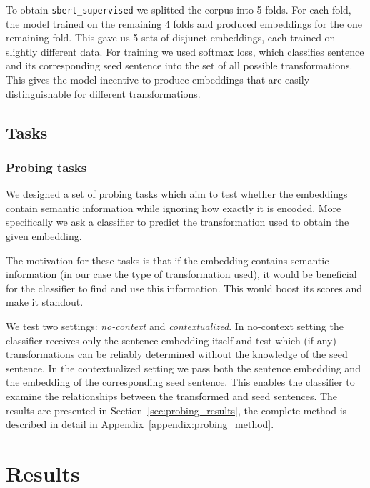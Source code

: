 \documentclass[11pt]{article}
\newcommand{\Embed}[1]{\texttt{#1}}
\begin{document}
To obtain \Embed{sbert\_supervised} we splitted the corpus into 5 folds. For
each fold, the model trained on the remaining 4 folds and produced embeddings
for the one remaining fold. This gave us 5 sets of disjunct embeddings, each
trained on slightly different data. For training we used softmax loss, which
classifies sentence and its corresponding seed sentence into the set of all
possible transformations. This gives the model incentive to produce embeddings
that are easily distinguishable for different transformations.


\subsection{Tasks}


\subsubsection{Probing tasks}

We designed a set of probing tasks which aim to test whether the embeddings
contain semantic information while ignoring how exactly it is encoded. More
specifically we ask a classifier to predict the transformation used to obtain
the given embedding.

The motivation for these tasks is that if the embedding contains semantic
information (in our case the type of transformation used), it would be
beneficial for the classifier to find and use this information. This would
boost its scores and make it standout.

We test two settings: \emph{no-context} and \emph{contextualized}. In
no-context setting the classifier receives only the sentence embedding itself
and test which (if any) transformations can be reliably determined without the
knowledge of the seed sentence. In the contextualized setting we pass both the
sentence embedding and the embedding of the corresponding seed sentence. This
enables the classifier to examine the relationships between the transformed and
seed sentences. The results are presented in Section~\ref{sec:probing_results},
the complete method is described in detail in
Appendix~\ref{appendix:probing_method}.


\section{Results}
\end{document}
